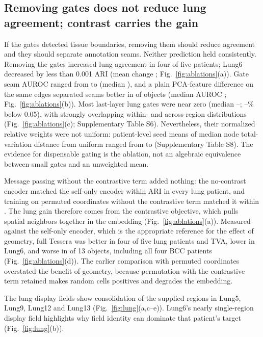 \documentclass[11pt]{article}
\newcommand{\panelref}[2]{Fig.~\ref{#1}(#2)}
\begin{document}
\subsection{Removing gates does not reduce lung agreement; contrast carries the gain}
If the gates detected tissue boundaries, removing them should reduce agreement and they should separate annotation seams. Neither prediction held consistently. Removing the gates increased lung agreement in four of five patients; Lung6 decreased by less than 0.001 ARI (mean change \NoGateMean{}; \panelref{fig:ablations}{a}). Gate seam AUROC ranged from \GateAurocMin{} to \GateAurocMax{} (median \GateAurocMedian{}), and a plain PCA-feature difference on the same edges separated seams better in \GateBeaten{} of \GateObjects{} objects (median AUROC \GateExprAurocMedian{}; \panelref{fig:ablations}{b}). Most last-layer lung gates were near zero (median \LungGateMedianMin{}--\LungGateMedianMax{}; \LungGateLowMin{}--\LungGateLowMax{}\% below 0.05), with strongly overlapping within- and across-region distributions (\panelref{fig:ablations}{c}; Supplementary Table S6). Nevertheless, their normalized relative weights were not uniform: patient-level seed means of median node total-variation distance from uniform ranged from \LungWeightTvdMin{} to \LungWeightTvdMax{} (Supplementary Table S8). The evidence for dispensable gating is the ablation, not an algebraic equivalence between small gates and an unweighted mean.

Message passing without the contrastive term added nothing: the no-contrast encoder matched the self-only encoder within \NoContrastSelfMaxGap{} ARI in every lung patient, and training on permuted coordinates without the contrastive term matched it within \PermNoContrastMaxGap{}. The lung gain therefore comes from the contrastive objective, which pulls spatial neighbors together in the embedding (\panelref{fig:ablations}{a}). Measured against the self-only encoder, which is the appropriate reference for the effect of geometry, full Tessera was better in four of five lung patients and TVA, lower in Lung6, and worse in \BelowSelfOnly{} of 13 objects, including all four BCC patients (\panelref{fig:ablations}{d}). The earlier comparison with permuted coordinates overstated the benefit of geometry, because permutation with the contrastive term retained makes random cells positives and degrades the embedding.



The lung display fields show consolidation of the supplied regions in Lung5, Lung9, Lung12 and Lung13 (\panelref{fig:lung}{a,c--e}). Lung6's nearly single-region display field highlights why field identity can dominate that patient's target (\panelref{fig:lung}{b}).
\end{document}

